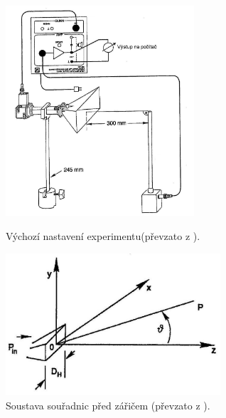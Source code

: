 \documentclass[english]{article}
\begin{document}
	\begin{figure}[h!]
	\centering
	\begin{minipage}{.40\textwidth}
	  \centering
				\includegraphics[width=7cm]{att/vychozi_nastaveni.jpg}
				\caption{Výchozí nastavení experimentu\newline (převzato z  \cite{bib:zadani}).}
				\label{fig:vychozi_nastaveni}
	\end{minipage}%
	\hfill
	\begin{minipage}{.50\textwidth}
	  \centering
			\includegraphics[width=8cm]{att/soustava_souradnic.jpg}
			\caption{Soustava souřadnic před zářičem (převzato z  \cite{bib:zadani}).}
			\label{fig:soustava_souradnic}
	\end{minipage}
	\end{figure}
	
\end{document}
